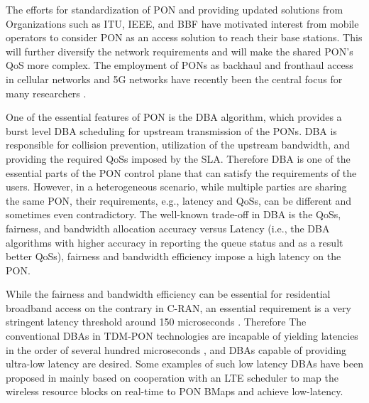 The efforts for standardization of \ac{PON} and providing updated solutions from Organizations such as \ac{ITU}, \ac{IEEE}, and \ac{BBF} have motivated interest from mobile operators to consider \ac{PON} as an access solution to reach their base stations. This will further diversify the network requirements and will make the shared \ac{PON}'s \ac{QoS} more complex. The employment of \acp{PON} as backhaul and fronthaul access in cellular networks and \ac{5G} networks have recently been the central focus for many researchers \cite{7121508,Fiorani2015}.


One of the essential features of \ac{PON} is the \ac{DBA} algorithm, which provides a burst level \ac{DBA} scheduling for upstream transmission of the \acp{PON}. \ac{DBA} is responsible for collision prevention, utilization of the upstream bandwidth, and providing the required \acp{QoS} imposed by the \ac{SLA}. Therefore \ac{DBA} is one of the essential parts of the \ac{PON} control plane that can satisfy the requirements of the users. However, in a heterogeneous scenario, while multiple parties are sharing the same \ac{PON}, their requirements, e.g., latency and \acp{QoS}, can be different and sometimes even contradictory. The well-known trade-off in \ac{DBA} is the \acp{QoS}, fairness, and bandwidth allocation accuracy versus Latency (i.e., the \ac{DBA} algorithms with higher accuracy in reporting the queue status and as a result better \acp{QoS}), fairness and bandwidth efficiency impose a high latency on the \ac{PON}. 

While the fairness and bandwidth efficiency can be essential for residential broadband access on the contrary in \ac{C-RAN}, an essential requirement is a very stringent latency threshold around 150 microseconds \cite{7456186}. Therefore The conventional \acp{DBA} in TDM-PON technologies are incapable of yielding latencies in the order of several hundred microseconds \cite{6950589}, and \acp{DBA} capable of providing ultra-low latency are desired. Some examples of such low latency \acp{DBA} have been proposed in \cite{6886953,7511482,Zhou:17} mainly based on cooperation with an LTE scheduler to map the wireless resource blocks on real-time to \ac{PON} \acp{BMap} and achieve low-latency.


